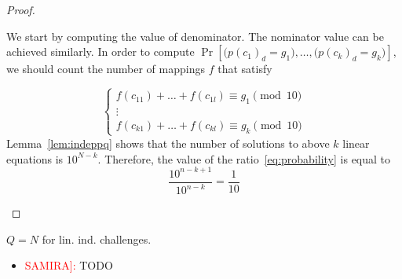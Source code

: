 \documentclass[anon,12pt]{colt2016}
\begin{document}
\begin{proof}
\begin{itemize}
	We start by computing the value of denominator. The nominator value can be achieved similarly. In order to compute $\Pr[\big(p(c_1)_d=g_1\big),\ldots, \big(p(c_k)_d=g_k\big)]$, we should count the number of mappings $f$ that satisfy 
	
	\begin{equation}
	\label{linearSet}
	\left\{ \begin{array}{l}
     f(c_{11})+\ldots+ f(c_{1l})\equiv g_1 \pmod{10}\\
     \vdots       \\
     f(c_{k1})+\ldots+ f(c_{kl})\equiv g_{k} \pmod{10}
    \end{array} \right.	
	\end{equation}
Lemma~\ref{lem:indeppq} shows that the number of solutions to above $k$ linear equations is $10^{N-{k}}$. Therefore, the value of the ratio~\eqref{eq:probability} is equal to
$$
\frac{10^{n-{k+1}}}{10^{n-k}} = \frac{1}{10}
$$
\end{itemize}

	
\end{proof}






\begin{lemma}

	$Q = N$ for lin. ind. challenges.
	\begin{itemize}
		\item \textcolor{red}{SAMIRA]:} TODO
	\end{itemize}
\end{lemma}
\end{document}

